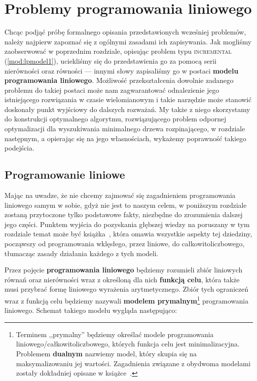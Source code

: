 \chapter{Problemy programowania liniowego}
\thispagestyle{chapterBeginStyle}
\label{ch:linearprog}

Chcąc podjąć próbę formalnego opisania przedstawionych wcześniej problemów, należy najpierw zapoznać się z ogólnymi zasadami ich zapisywania. Jak mogliśmy zaobserwować w poprzednim rozdziale, opisując problem typu \textsc{incremental} (\ref{mod:lpmodel1}), uciekliśmy się do przedstawienia go za pomocą serii nierówności oraz równości --- innymi słowy zapisaliśmy go w postaci \textbf{modelu programowania liniowego}. Możliwość przekształcenia dowolnie zadanego problemu do takiej postaci może nam zagwarantować odnalezienie jego istniejącego rozwiązania w czasie wielomianowym i takie narzędzie może stanowić doskonały punkt wyjściowy do dalszych rozważań. My także z niego skorzystamy do konstrukcji optymalnego algorytmu, rozwiązującego problem odpornej optymalizacji dla wyszukiwania minimalnego drzewa rozpinającego, w rozdziale następnym, a opierając się na jego własnościach, wykażemy poprawność takiego podejścia.

\section{Programowanie liniowe}

Mając na uwadze, że nie chcemy zajmować się zagadnieniem programowania liniowego samym w sobie, gdyż nie jest to naszym celem, w poniższym rozdziale zostaną przytoczone tylko podstawowe fakty, niezbędne do zrozumienia dalszej jego części. Punktem wyjścia do pozyskania głębszej wiedzy na poruszany w tym rozdziale temat może być książka~\cite{Papadimitriou:1982:COA:31027}, która omawia wszystkie aspekty tej dziedziny, począwszy od programowania wklęsłego, przez liniowe, do całkowitoliczbowego, tłumacząc zasady działania każdego z tych modeli.

Przez pojęcie \textbf{programowania liniowego} będziemy rozumieli zbiór liniowych równań oraz nierówności wraz z określoną dla nich \textbf{funkcją celu}, która także musi przybrać formę liniowego wyrażenia arytmetycznego. Zbiór tych ograniczeń wraz z funkcją celu będziemy nazywali \textbf{modelem prymalnym}\footnote{Terminem ,,prymalny'' będziemy określać modele programowania liniowego/całkowitoliczbowego, których funkcja celu jest minimalizacyjna. Problemem \textbf{dualnym} nazwiemy model, który skupia się na maksymalizowaniu jej wartości. Zagadnienia związane z obydwoma modelami zostały dokładniej opisane w książce~\cite[$67$--$73$]{Papadimitriou:1982:COA:31027}.} programowania liniowego. Schemat takiego modelu wygląda następująco:

